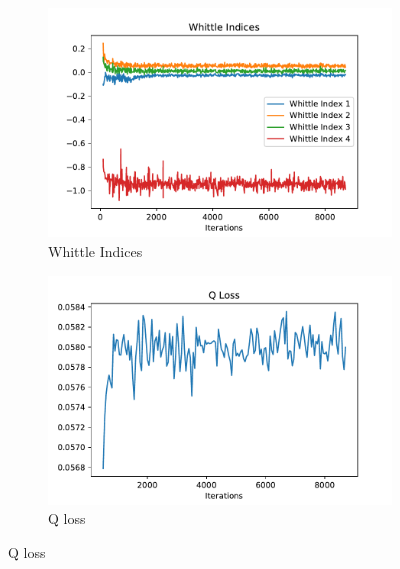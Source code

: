\documentclass{article}
\theoremstyle{definition}
\begin{document}
\begin{figure}[H]
\ContinuedFloat
     \captionsetup[subfigure]{justification=centering}
     \centering
     \begin{subfigure}{0.48\linewidth}
         \centering
         \includegraphics[width=1\linewidth]{images/whittle1/all.pdf}
         \caption{Whittle Indices}
         \label{Whittle Indices1}
     \end{subfigure}
     \begin{subfigure}{0.48\linewidth}
         \centering
         \includegraphics[width=1\linewidth]{images/whittle1/Q Loss.pdf}
         \caption{Q loss}
         \label{}
     \end{subfigure}
     

\end{figure}
\end{document}
